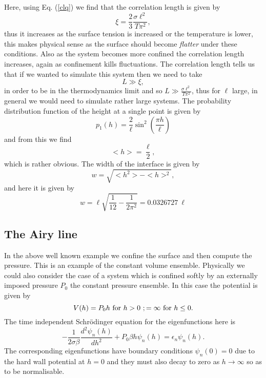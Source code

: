 Here, using Eq. (\ref{clq}) we find that  the correlation length is given by
\begin{equation}
    \xi = \frac{2}{3}\frac{\sigma \ell^2}{T\pi^2},
    \label{corel}
\end{equation}
thus it increases as the surface tension is increased or the temperature is lower, this makes physical sense as the surface should become {\em flatter} under these conditions. Also as the system becomes more confined the correlation length increases, again as  confinement  
kills fluctuations. The correlation length tells us that if we wanted to simulate this system then we need to take
\begin{equation}
    L\gg \xi ,
\end{equation}
in order to be in the thermodynamics limit and so $L \gg \frac{\sigma \ell^2}{T\pi^2}$, thus for 
$\ell$ large, in general we would need to simulate rather large systems.
The probability distribution function of the height at a single point is given by
\begin{equation}
    p_1(h) =\frac{2}{\ell}\sin^2(\frac{\pi h}{\ell})
\end{equation}
and from this we find 
\begin{equation}
    < h> = \frac{\ell}{2},  
\end{equation}
which is rather obvious. The width of the interface is given by 
\begin{equation}
    w=\sqrt{< h^2> - < h>^2},
\end{equation}
and here it is given by
\begin{equation}
    w= \ell\sqrt{\frac{1}{12}-\frac{1}{2\pi^2}}= 0.0326727\  \ell
\end{equation}

    \subsection{The Airy line}
In the  above well known example we confine the surface and then compute the pressure. This is an example of the constant volume ensemble. Physically we could also consider the case of a system which is confined softly by an externally imposed pressure $P_0$ the constant pressure ensemble. In this case the potential is given by
\begin{equation}
    V(h) = P_0 h \ {\rm for }\ h>0\ ; =\infty \ {\rm for}\ h\leq 0. 
\end{equation}
The time independent Schr\"odinger equation for the eigenfunctions here is
\begin{equation}
    -\frac{1}{2\sigma\beta}\frac{d^2 \psi_n(h)}{dh^2} + P_0\beta h \psi_n(h) = \epsilon_n\psi_n(h).
\end{equation}
The corresponding eigenfunctions have boundary conditions $\psi_n(0)=0$ due to the hard wall potential at $h=0$ and they must also decay to zero as $h\to \infty$ so as to be normalisable.

